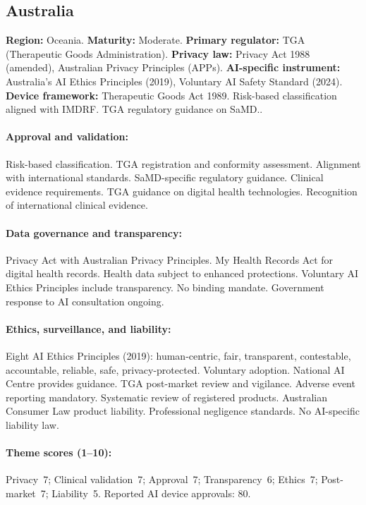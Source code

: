 {\subsection{Australia}
\textbf{Region:} Oceania.
\textbf{Maturity:} Moderate.
\textbf{Primary regulator:} TGA (Therapeutic Goods Administration).
\textbf{Privacy law:} Privacy Act 1988 (amended), Australian Privacy Principles (APPs).
\textbf{AI-specific instrument:} Australia's AI Ethics Principles (2019), Voluntary AI Safety Standard (2024).
\textbf{Device framework:} Therapeutic Goods Act 1989. Risk-based classification aligned with IMDRF. TGA regulatory guidance on SaMD..

\paragraph{Approval and validation:}
Risk-based classification. TGA registration and conformity assessment. Alignment with international standards. SaMD-specific regulatory guidance.
Clinical evidence requirements. TGA guidance on digital health technologies. Recognition of international clinical evidence.

\paragraph{Data governance and transparency:}
Privacy Act with Australian Privacy Principles. My Health Records Act for digital health records. Health data subject to enhanced protections.
Voluntary AI Ethics Principles include transparency. No binding mandate. Government response to AI consultation ongoing.

\paragraph{Ethics, surveillance, and liability:}
Eight AI Ethics Principles (2019): human-centric, fair, transparent, contestable, accountable, reliable, safe, privacy-protected. Voluntary adoption. National AI Centre provides guidance.
TGA post-market review and vigilance. Adverse event reporting mandatory. Systematic review of registered products.
Australian Consumer Law product liability. Professional negligence standards. No AI-specific liability law.

\paragraph{Theme scores (1--10):}
Privacy~7;
Clinical validation~7;
Approval~7;
Transparency~6;
Ethics~7;
Post-market~7;
Liability~5.
Reported AI device approvals: 80.

}
